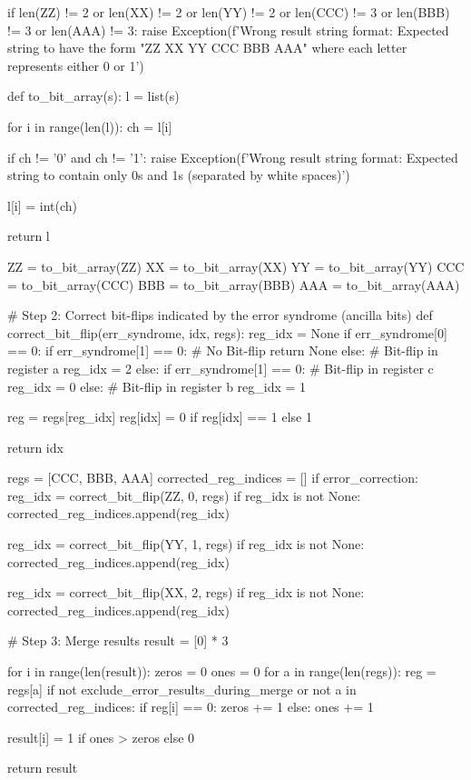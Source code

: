 \begin{python}
    if len(ZZ) != 2 or len(XX) != 2 or len(YY) != 2 or len(CCC) != 3 or len(BBB) != 3 or len(AAA) != 3:
        raise Exception(f'Wrong result string format: Expected string to have the form "ZZ XX YY CCC BBB AAA" where each letter represents either 0 or 1')

    def to_bit_array(s):
        l = list(s)

        for i in range(len(l)):
            ch = l[i]

            if ch != '0' and ch != '1':
                raise Exception(f'Wrong result string format: Expected string to contain only 0s and 1s (separated by white spaces)')

            l[i] = int(ch)

        return l


    ZZ = to_bit_array(ZZ)
    XX = to_bit_array(XX)
    YY = to_bit_array(YY)
    CCC = to_bit_array(CCC)
    BBB = to_bit_array(BBB)
    AAA = to_bit_array(AAA)

    # Step 2: Correct bit-flips indicated by the error syndrome (ancilla bits)
    def correct_bit_flip(err_syndrome, idx, regs):
        reg_idx = None
        if err_syndrome[0] == 0:
            if err_syndrome[1] == 0: # No Bit-flip
                return None
            else: # Bit-flip in register a
                reg_idx = 2
        else:
            if err_syndrome[1] == 0: # Bit-flip in register c
                reg_idx = 0
            else: # Bit-flip in register b
                reg_idx = 1

        reg = regs[reg_idx]
        reg[idx] = 0 if reg[idx] == 1 else 1

        return idx

    regs = [CCC, BBB, AAA]
    corrected_reg_indices = []
    if error_correction:
        reg_idx = correct_bit_flip(ZZ, 0, regs)
        if reg_idx is not None:
            corrected_reg_indices.append(reg_idx)

        reg_idx = correct_bit_flip(YY, 1, regs)
        if reg_idx is not None:
            corrected_reg_indices.append(reg_idx)

        reg_idx = correct_bit_flip(XX, 2, regs)
        if reg_idx is not None:
            corrected_reg_indices.append(reg_idx)

    # Step 3: Merge results
    result = [0] * 3

    for i in range(len(result)):
        zeros = 0
        ones = 0
        for a in range(len(regs)):
            reg = regs[a]
            if not exclude_error_results_during_merge or not a in corrected_reg_indices:
                if reg[i] == 0:
                    zeros += 1
                else:
                    ones += 1

        result[i] = 1 if ones > zeros else 0

    return result
\end{python}

